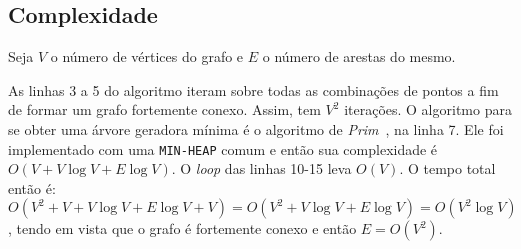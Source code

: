 \documentclass[7pt]{article}
\newcommand{\tit}[1]{\textit{#1}}
\newcommand{\ttt}[1]{\texttt{#1}}
\begin{document}
\begin{multicols}{2}
\section{Complexidade}
Seja $V$ o número de vértices do grafo e $E$ o número de arestas do mesmo.

As linhas 3 a 5 do algoritmo iteram sobre todas as combinações de pontos
a fim de formar um grafo fortemente conexo. Assim, tem $V^2$ iterações.
O algoritmo para se obter uma árvore geradora mínima é o algoritmo de
\tit{Prim}~\cite{clrs}, na linha 7.
Ele foi implementado com uma \ttt{MIN-HEAP} comum e então sua
complexidade é $O(V + V\log{V} + E\log{V})$.
O \tit{loop} das linhas 10-15 leva $O(V)$.
O tempo total então é:
$O(V^2 + V + V\log{V} + E\log{V} + V) = O(V^2 + V\log{V} + E\log{V}) =
O(V^2\log{V})$,
tendo em vista que o grafo é fortemente conexo e então $E = O(V^2)$.

\printbibliography

\end{multicols}
\end{document}

